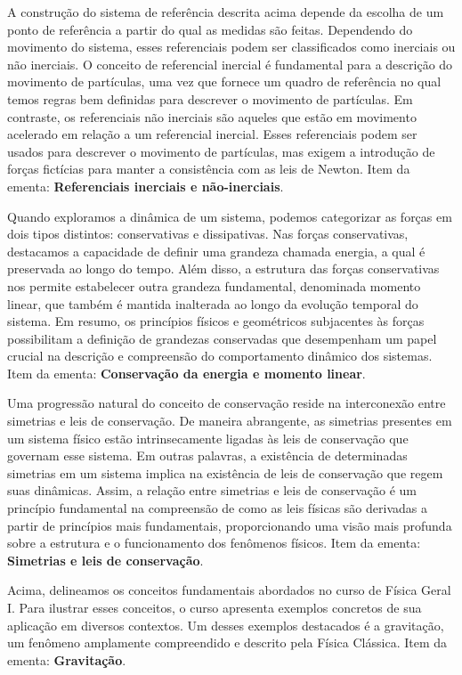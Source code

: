 \documentclass[a4paper, 12pt]{article}
\begin{document}
A construção do sistema de referência descrita acima depende da escolha de um ponto de
referência a partir do qual as medidas são feitas. Dependendo do movimento do sistema,
esses referenciais podem ser classificados como inerciais ou não inerciais. O conceito
de referencial inercial é fundamental para a descrição do movimento de partículas, uma
vez que fornece um quadro de referência no qual temos regras bem definidas para
descrever o movimento de partículas. Em contraste, os referenciais não inerciais são
aqueles que estão em movimento acelerado em relação a um referencial inercial. Esses
referenciais podem ser usados para descrever o movimento de partículas, mas exigem a
introdução de forças fictícias para manter a consistência com as leis de Newton. Item
da ementa: {\bf Referenciais inerciais e não-inerciais}.

Quando exploramos a dinâmica de um sistema, podemos categorizar as forças em dois tipos
distintos: conservativas e dissipativas. Nas forças conservativas, destacamos a
capacidade de definir uma grandeza chamada energia, a qual é preservada ao longo do
tempo. Além disso, a estrutura das forças conservativas nos permite estabelecer outra
grandeza fundamental, denominada momento linear, que também é mantida inalterada ao
longo da evolução temporal do sistema. Em resumo, os princípios físicos e geométricos
subjacentes às forças possibilitam a definição de grandezas conservadas que desempenham
um papel crucial na descrição e compreensão do comportamento dinâmico dos sistemas.
Item da ementa: {\bf Conservação da energia e momento linear}.

Uma progressão natural do conceito de conservação reside na interconexão entre
simetrias e leis de conservação. De maneira abrangente, as simetrias presentes em um
sistema físico estão intrinsecamente ligadas às leis de conservação que governam esse
sistema. Em outras palavras, a existência de determinadas simetrias em um sistema
implica na existência de leis de conservação que regem suas dinâmicas. Assim, a relação
entre simetrias e leis de conservação é um princípio fundamental na compreensão de como
as leis físicas são derivadas a partir de princípios mais fundamentais, proporcionando
uma visão mais profunda sobre a estrutura e o funcionamento dos fenômenos físicos. Item
da ementa: {\bf Simetrias e leis de conservação}.

Acima, delineamos os conceitos fundamentais abordados no curso de Física Geral I. Para
ilustrar esses conceitos, o curso apresenta exemplos concretos de sua aplicação em
diversos contextos. Um desses exemplos destacados é a gravitação, um fenômeno
amplamente compreendido e descrito pela Física Clássica. Item da ementa: {\bf
Gravitação}.
\end{document}
